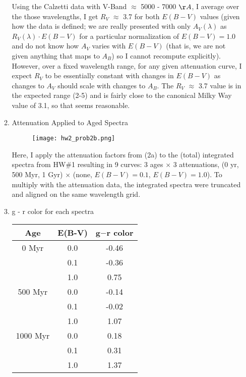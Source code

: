 \documentclass[11pt]{article}
\begin{document}
\begin{enumerate}
\begin{enumerate}

		Using the Calzetti data with V-Band $\approx$ 5000 - 7000 $\AA$, I average over the those wavelengths, I get $R_V$ $\approx$ 3.7 for both $E(B-V)$ values (given how the data is defined; we are really presented with only $A_{V}(\lambda)$ as $R_{V}(\lambda) \cdot E(B-V)$ for a particular normalization of $E(B-V)=1.0$ and do not know how $A_V$ varies with $E(B-V)$ (that is, we are not given anything that maps to $A_B$) so I cannot recompute explicitly). However, over a fixed wavelength range, for any given attenuation curve, I expect $R_V$ to be essentially constant with changes in $E(B-V)$ as changes to $A_V$ should scale with changes to $A_B$. The $R_V$ $\approx$ 3.7 value is in the expected range (2-5) and is fairly close to the canonical Milky Way value of 3.1, so that seems reasonable.

    \item Attenuation Applied to Aged Spectra\\
    
       		\begin{figure}[H]
    		    \texttt{[image: hw2\_prob2b.png]}
    		    \caption{}
    		    \label{}
       		\end{figure}
	       		
	       		
	 Here, I apply the attenuation factors from (2a) to the (total) integrated spectra from HW\#1 resulting in 9 curves: 3 ages $\times$ 3 attenuations, (0 yr, 500 Myr, 1 Gyr) $\times$ (none, $E(B-V)=0.1$, $E(B-V)=1.0$). To multiply with the attenuation data, the integrated spectra were truncated and aligned on the same wavelength grid.
    
    \newpage
    \item g - r color for each spectra\\
    

    	\begin{tabular}{c|c|c}
    	Age & E(B-V) & g$-$r color \\
    	  \hline
    	  0 Myr &  0.0 & -0.46 \\
    		   &  0.1 & -0.36 \\
    		   &  1.0 & 0.75 \\
    	  \hline
    	  500 Myr & 0.0 & -0.14 \\
    			  & 0.1 & -0.02 \\
    			  & 1.0 & 1.07 \\
    	  \hline
    	  1000 Myr &  0.0 & 0.18 \\
    	  		&  0.1 & 0.31 \\
    	  	    &  1.0 & 1.37 \\
    	  \hline
    	\end{tabular}
    

\end{enumerate}
\end{enumerate}
\end{document}
